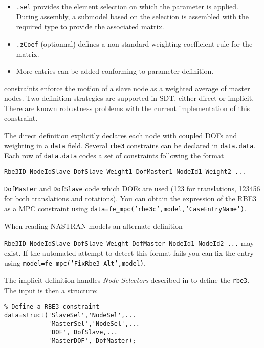 \begin{SDT}
\begin{itemize}
\begin{itemize}
\item {\tt .sel} provides the element selection on which the parameter is applied. During assembly, a submodel based on the selection is assembled with the required type to provide the associated matrix.
\item {\tt .zCoef} (optionnal) defines a non standard weighting coefficient rule for the matrix.
\item More entries can be added conforming to \ferange parameter definition.
\end{itemize}
\end{itemize}

\end{SDT}


 constraints enforce the motion of a slave node as a weighted average of master nodes. Two definition strategies are supported in SDT, either direct or implicit. There are known robustness problems with the current implementation of this constraint.

The direct definition explicitly declares each node with coupled DOFs and weighting in a {\tt data} field. Several {\tt rbe3} constrains can be declared in {\tt data.data}. Each row of {\tt data.data} codes a set of constraints following the format

{\tt Rbe3ID NodeIdSlave DofSlave Weight1 DofMaster1 NodeId1 Weight2 ...}

{\tt DofMaster} and {\tt DofSlave} code which DOFs are used (123 for translations, 123456 for both translations and rotations). You can obtain the expression of the RBE3 as a MPC constraint using {\tt data=fe\_mpc('rbe3c',model,'CaseEntryName')}. 

When reading NASTRAN models an alternate definition 

{\tt Rbe3ID NodeIdSlave DofSlave Weight DofMaster NodeId1 NodeId2 ...}
%
may exist. If the automated attempt to detect this format fails you can fix the entry using {\tt model=fe\_mpc('FixRbe3 Alt',model)}. 


The implicit definition handles {\it Node Selectors} described in  to define the {\tt rbe3}. The input is then a structure:

\begin{verbatim}
% Define a RBE3 constraint
data=struct('SlaveSel','NodeSel',...
            'MasterSel','NodeSel',...
            'DOF', DofSlave,...
            'MasterDOF', DofMaster);
\end{verbatim}

